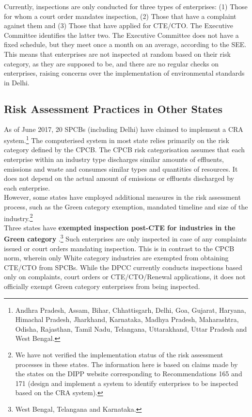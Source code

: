 \documentclass[a4paper, 12pt]{article}
\begin{document}
	Currently, inspections are only conducted for three types of enterprises: (1) Those for whom a court order mandates inspection, (2) Those that have a complaint against them and (3) Those that have applied for CTE/CTO. The Executive Committee identifies the latter two. The Executive Committee does not have a fixed schedule, but they meet once a month on an average, according to the SEE. This means that enterprises are not inspected at random based on their risk category, as they are supposed to be, and there are no regular checks on enterprises, raising concerns over the implementation of environmental standards in Delhi. 
	
	\subsection{Risk Assessment Practices in Other States}
	
	As of June 2017, 20 SPCBs (including Delhi) have claimed to implement a CRA system.\footnote{Andhra Pradesh, Assam, Bihar, Chhattisgarh, Delhi, Goa, Gujarat, Haryana, Himachal Pradesh, Jharkhand, Karnataka, Madhya Pradesh, Maharashtra, Odisha, Rajasthan, Tamil Nadu, Telangana, Uttarakhand, Uttar Pradesh and West Bengal.} The computerised system in most state relies primarily on the risk category defined by the CPCB. The CPCB risk categorisation assumes that each enterprise within an industry type discharges similar amounts of effluents, emissions and waste and consumes similar types and quantities of resources. It does not depend on the actual amount of emissions or effluents discharged by each enterprise. \\
	
	However, some states have employed additional measures in the risk assessment process, such as the Green category exemption, mandated timeline and size of the industry.\footnote{We have not verified the implementation status of the risk assessment processes in these states. The information here is based on claims made by the states on the DIPP website corresponding to Recommendations 165 and 171 (design and implement a system to identify enterprises to be inspected based on the CRA system).} \\
	
	Three states have \textbf{exempted inspection post-CTE for industries in the Green category} \parencite{DIPPd}.\footnote{West Bengal, Telangana and Karnataka.} Such enterprises are only inspected in case of any complaints issued or court orders mandating inspection. This is in contrast to the CPCB norm, wherein only White category industries are exempted from obtaining CTE/CTO from SPCBs. While the DPCC currently conducts inspections based only on complaints, court orders or CTE/CTO/Renewal applications, it does not officially exempt Green category enterprises from being inspected. \\
	
\end{document}
